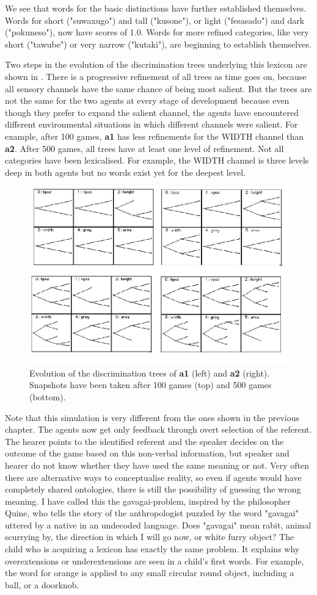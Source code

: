 We see that words for the basic distinctions have further established
themselves. Words for short ("suwaxugo") and tall ("kusone"), or light ("fesasado") and dark 
("pokuneso"), now have scores of 1.0. Words for more refined categories, like very short ("tawube") or 
very narrow ("kutaki"), are beginning to establish themselves.  

Two steps in the evolution of the discrimination trees
underlying this lexicon are shown in .
There is a progressive refinement 
of all trees as time goes on, 
because all sensory channels have the same chance
of being most salient. But the trees are not 
the same for the two agents at every stage
of development because even though they prefer to expand
the salient channel, the agents have encountered 
different environmental situations in which different
channels were salient. For example, after 100 
games, {\bf a1} has less refinements for the 
WIDTH channel than {\bf a2}. 
After 500 games, all trees 
have at least one level of refinement. Not all 
categories have been lexicalised. For example, the 
WIDTH channel is three levels deep in both 
agents but no words exist yet for the deepest 
level. 
\begin{figure}[htbp]
  \centerline{\includegraphics[width=.65\textwidth]{chap6/figs/gdis}}
\caption{\label{gdis1} Evolution of the discrimination
trees of {\bf a1} (left) and {\bf a2} (right).
Snapshots have been taken after 100 games (top) and 500 
games (bottom).} 
\end{figure}

Note that this simulation is very different from the 
ones shown in the previous chapter. The agents now get 
only feedback through overt selection of the referent. 
The hearer points to the identified referent and the speaker 
decides on the outcome of the game based on this 
non-verbal information, but speaker and hearer do not 
know whether they have used the same meaning or not. 
Very often there are alternative ways
to conceptualise reality, so even if agents would have
completely shared ontologies, there is still the possibility 
of guessing the wrong meaning. I have called this
the gavagai-problem, inspired by the philosopher
Quine, who tells the story of the anthropologist 
puzzled by the word "gavagai" uttered by a native 
in an undecoded language. Does "gavagai" mean rabit, animal 
scurrying by, the direction in which I will go 
now, or white furry object? 
The child who is acquiring a lexicon has
exactly the same problem. It explains why 
overextensions or underextensions
are seen in a child's first words. For example, 
the word for orange is applied to any small circular round 
object, including a ball, or a doorknob.

